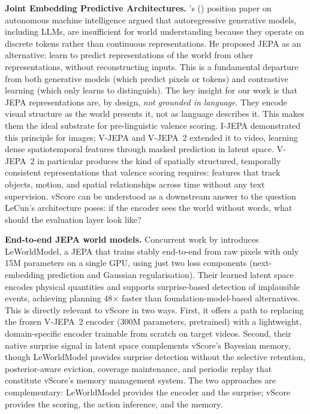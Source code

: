 \documentclass[11pt]{article}
\begin{document}
\textbf{Joint Embedding Predictive Architectures.} \citeauthor{lecun2022}'s (\citeyear{lecun2022}) position paper on autonomous machine intelligence argued that autoregressive generative models, including LLMs, are insufficient for world understanding because they operate on discrete tokens rather than continuous representations. He proposed JEPA as an alternative: learn to predict representations of the world from other representations, without reconstructing inputs. This is a fundamental departure from both generative models (which predict pixels or tokens) and contrastive learning (which only learns to distinguish). The key insight for our work is that JEPA representations are, by design, \emph{not grounded in language}. They encode visual structure as the world presents it, not as language describes it. This makes them the ideal substrate for pre-linguistic valence scoring. I-JEPA \citep{assran2023} demonstrated this principle for images; V-JEPA \citep{bardes2024} and V-JEPA~2 \citep{bardes2025} extended it to video, learning dense spatiotemporal features through masked prediction in latent space. V-JEPA~2 in particular produces the kind of spatially structured, temporally consistent representations that valence scoring requires: features that track objects, motion, and spatial relationships across time without any text supervision. vScore can be understood as a downstream answer to the question LeCun's architecture poses: if the encoder sees the world without words, what should the evaluation layer look like?

\textbf{End-to-end JEPA world models.} Concurrent work by \citet{maes2026} introduces LeWorldModel, a JEPA that trains stably end-to-end from raw pixels with only 15M parameters on a single GPU, using just two loss components (next-embedding prediction and Gaussian regularisation). Their learned latent space encodes physical quantities and supports surprise-based detection of implausible events, achieving planning 48$\times$ faster than foundation-model-based alternatives. This is directly relevant to vScore in two ways. First, it offers a path to replacing the frozen V-JEPA~2 encoder (300M parameters, pretrained) with a lightweight, domain-specific encoder trainable from scratch on target videos. Second, their native surprise signal in latent space complements vScore's Bayesian memory, though LeWorldModel provides surprise detection without the selective retention, posterior-aware eviction, coverage maintenance, and periodic replay that constitute vScore's memory management system. The two approaches are complementary: LeWorldModel provides the encoder and the surprise; vScore provides the scoring, the action inference, and the memory.
\end{document}
